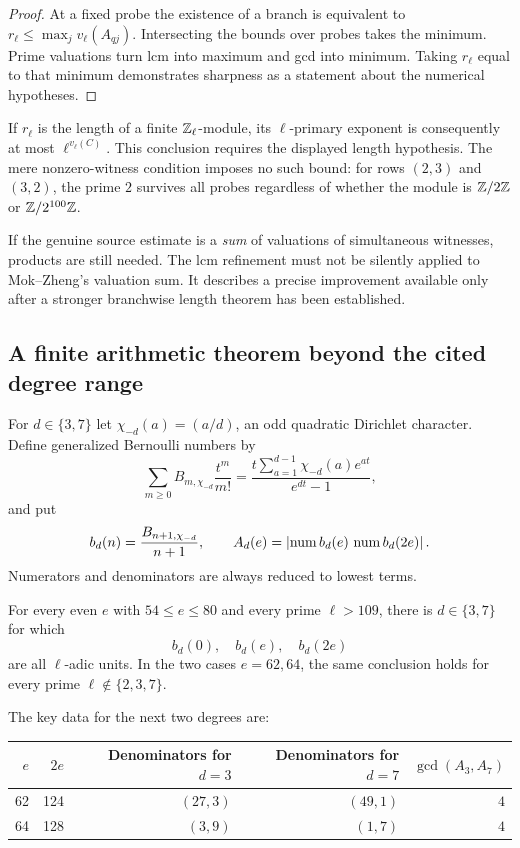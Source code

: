 \begin{proof}
At a fixed probe the existence of a branch is equivalent to
$r_\ell\le\max_jv_\ell(A_{qj})$. Intersecting the bounds over probes
takes the minimum. Prime valuations turn lcm into maximum and gcd
into minimum. Taking $r_\ell$ equal to that minimum demonstrates
sharpness as a statement about the numerical hypotheses.
\end{proof}

If $r_\ell$ is the length of a finite $\mathbb Z_\ell$-module, its
$\ell$-primary exponent is consequently at most $\ell^{v_\ell(C)}$.
This conclusion requires the displayed length hypothesis. The
mere nonzero-witness condition imposes no such bound: for rows
$(2,3)$ and $(3,2)$, the prime $2$ survives all probes regardless
of whether the module is $\mathbb Z/2\mathbb Z$ or $\mathbb Z/2^{100}\mathbb Z$.

If the genuine source estimate is a \emph{sum} of valuations of
simultaneous witnesses, products are still needed. The lcm
refinement must not be silently applied to Mok--Zheng's valuation
sum. It describes a precise improvement available only after a
stronger branchwise length theorem has been established.

\subsection{A finite arithmetic theorem beyond the cited degree range}

For $d\in\{3,7\}$ let $\chi_{-d}(a)=(a/d)$, an odd quadratic
Dirichlet character. Define generalized Bernoulli numbers by
\[
 \sum_{m\ge0}B_{m,\chi_{-d}}\frac{t^m}{m!}
 =\frac{t\sum_{a=1}^{d-1}\chi_{-d}(a)e^{at}}{e^{dt}-1},
\]
and put
\[
 b_d(n)=\frac{B_{n+1,\chi_{-d}}}{n+1},\qquad
 A_d(e)=\left|\operatorname{num} b_d(e)\,\operatorname{num} b_d(2e)\right|.
\]
Numerators and denominators are always reduced to lowest terms.

\begin{theorem}\label{thm:screening}
For every even $e$ with $54\le e\le80$ and every prime $\ell>109$,
there is $d\in\{3,7\}$ for which
\[
 b_d(0),\quad b_d(e),\quad b_d(2e)
\]
are all $\ell$-adic units. In the two cases $e=62,64$, the same
conclusion holds for every prime $\ell\notin\{2,3,7\}$.
\end{theorem}

The key data for the next two degrees are:

\begin{center}
\begin{tabular}{@{}rrrrr@{}}
\toprule
$e$ & $2e$ & Denominators for $d=3$ &
Denominators for $d=7$ & $\gcd(A_3,A_7)$\\
\midrule
62 & 124 & $(27,3)$ & $(49,1)$ & $4$\\
64 & 128 & $(3,9)$ & $(1,7)$ & $4$\\
\bottomrule
\end{tabular}
\end{center}

